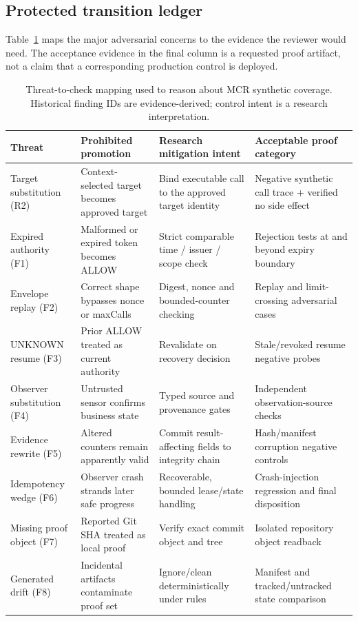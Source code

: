 \documentclass[11pt,twocolumn]{article}
\begin{document}
\subsection{Protected transition ledger}
Table~\ref{tab:attacks} maps the major adversarial concerns to the evidence the reviewer would need. The acceptance evidence in the final column is a requested proof artifact, not a claim that a corresponding production control is deployed.
\begin{table}[t]
\centering\caption{Threat-to-check mapping used to reason about MCR synthetic coverage. Historical finding IDs are evidence-derived; control intent is a research interpretation.}
\label{tab:attacks}
\footnotesize
\begin{tabularx}{\textwidth}{@{}p{}p{}p{}X@{}}
\toprule
\textbf{Threat} & \textbf{Prohibited promotion} & \textbf{Research mitigation intent} & \textbf{Acceptable proof category}\\\midrule
Target substitution (R2) & Context-selected target becomes approved target & Bind executable call to the approved target identity & Negative synthetic call trace + verified no side effect\\
Expired authority (F1) & Malformed or expired token becomes ALLOW & Strict comparable time / issuer / scope check & Rejection tests at and beyond expiry boundary\\
Envelope replay (F2) & Correct shape bypasses nonce or maxCalls & Digest, nonce and bounded-counter checking & Replay and limit-crossing adversarial cases\\
UNKNOWN resume (F3) & Prior ALLOW treated as current authority & Revalidate on recovery decision & Stale/revoked resume negative probes\\
Observer substitution (F4) & Untrusted sensor confirms business state & Typed source and provenance gates & Independent observation-source checks\\
Evidence rewrite (F5) & Altered counters remain apparently valid & Commit result-affecting fields to integrity chain & Hash/manifest corruption negative controls\\
Idempotency wedge (F6) & Observer crash strands later safe progress & Recoverable, bounded lease/state handling & Crash-injection regression and final disposition\\
Missing proof object (F7) & Reported Git SHA treated as local proof & Verify exact commit object and tree & Isolated repository object readback\\
Generated drift (F8) & Incidental artifacts contaminate proof set & Ignore/clean deterministically under rules & Manifest and tracked/untracked state comparison\\\bottomrule
\end{tabularx}
\end{table}
\end{document}
